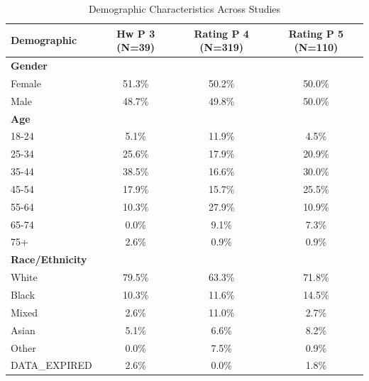 \begin{table}[h]
\centering
\caption{Demographic Characteristics Across Studies}
\begin{tabular}{|l|c|c|c|}
\hline
Demographic & Hw P 3 (N=39) & Rating P 4 (N=319) & Rating P 5 (N=110) \\
\hline
\textbf{Gender} & & & \\
Female & 51.3\% & 50.2\% & 50.0\% \\
Male & 48.7\% & 49.8\% & 50.0\% \\
\hline
\textbf{Age} & & & \\
18-24 & 5.1\% & 11.9\% & 4.5\% \\
25-34 & 25.6\% & 17.9\% & 20.9\% \\
35-44 & 38.5\% & 16.6\% & 30.0\% \\
45-54 & 17.9\% & 15.7\% & 25.5\% \\
55-64 & 10.3\% & 27.9\% & 10.9\% \\
65-74 & 0.0\% & 9.1\% & 7.3\% \\
75+ & 2.6\% & 0.9\% & 0.9\% \\
\hline
\textbf{Race/Ethnicity} & & & \\
White & 79.5\% & 63.3\% & 71.8\% \\
Black & 10.3\% & 11.6\% & 14.5\% \\
Mixed & 2.6\% & 11.0\% & 2.7\% \\
Asian & 5.1\% & 6.6\% & 8.2\% \\
Other & 0.0\% & 7.5\% & 0.9\% \\
DATA_EXPIRED & 2.6\% & 0.0\% & 1.8\% \\
\hline
\end{tabular}
\end{table}
